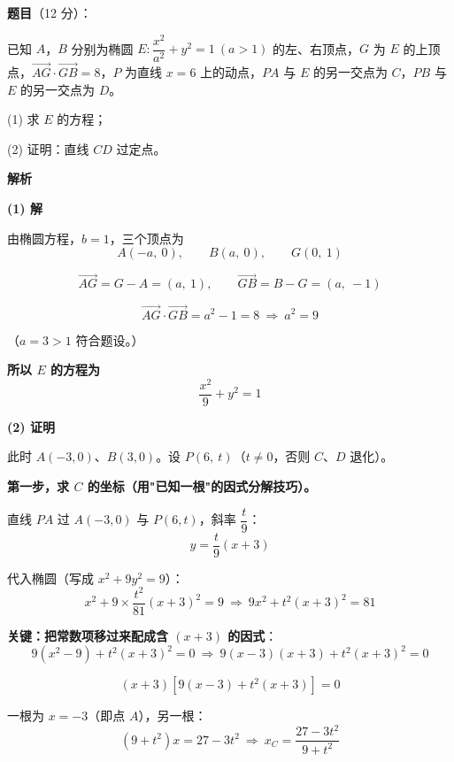 \begin{answer}

\textbf{题目}（12 分）：

已知 $A$，$B$ 分别为椭圆 $E:\dfrac{x^{2}}{a^{2}}+y^{2}=1\ (a>1)$ 的左、右顶点，$G$ 为 $E$ 的上顶点，$\overrightarrow{AG}\cdot\overrightarrow{GB}=8$，$P$ 为直线 $x=6$ 上的动点，$PA$ 与 $E$ 的另一交点为 $C$，$PB$ 与 $E$ 的另一交点为 $D$。

  (1) 求 $E$ 的方程；

  (2) 证明：直线 $CD$ 过定点。

\textbf{解析}

\par\medskip

\textbf{(1) 解}

由椭圆方程，$b=1$，三个顶点为
\nopagebreak[4]
\[A(-a,\ 0),\qquad B(a,\ 0),\qquad G(0,\ 1)\]

\nopagebreak[4]
\[\overrightarrow{AG}=G-A=(a,\ 1),\qquad \overrightarrow{GB}=B-G=(a,\ -1)\]

\nopagebreak[4]
\[\overrightarrow{AG}\cdot\overrightarrow{GB}=a^{2}-1=8\ \Longrightarrow\ a^{2}=9\]

（$a=3>1$  符合题设。）

\textbf{所以 $E$ 的方程为}
\nopagebreak[4]
\[\frac{x^{2}}9+y^{2}=1\]

\par\medskip

\textbf{(2) 证明}

此时 $A(-3,0)$、$B(3,0)$。设 $P(6,\ t)$（$t\ne0$，否则 $C$、$D$ 退化）。

\textbf{第一步，求 $C$ 的坐标（用"已知一根"的因式分解技巧）。}

直线 $PA$ 过 $A(-3,0)$ 与 $P(6,t)$，斜率 $\dfrac t9$：
\nopagebreak[4]
\[y=\frac t9(x+3)\]

代入椭圆（写成 $x^{2}+9y^{2}=9$）：
\nopagebreak[4]
\[x^{2}+9\times\frac{t^{2}}{81}(x+3)^{2}=9\ \Longrightarrow\ 9x^{2}+t^{2}(x+3)^{2}=81\]

\textbf{关键：把常数项移过来配成含 $(x+3)$ 的因式}：
\nopagebreak[4]
\[9\left(x^{2}-9\right)+t^{2}(x+3)^{2}=0\ \Longrightarrow\ 9(x-3)(x+3)+t^{2}(x+3)^{2}=0\]

\nopagebreak[4]
\[(x+3)\left[9(x-3)+t^{2}(x+3)\right]=0\]

一根为 $x=-3$（即点 $A$），另一根：
\nopagebreak[4]
\[\left(9+t^{2}\right)x=27-3t^{2}\ \Longrightarrow\ x_C=\frac{27-3t^{2}}{9+t^{2}}\]


\end{answer}
